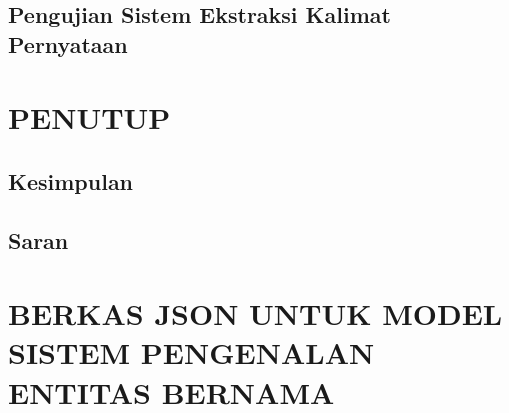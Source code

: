 \documentclass[ugmskripsi]{ugmskripsi}
\begin{document}
	\section{Pengujian Sistem Ekstraksi Kalimat Pernyataan}
	\label{pengujian sistem ekstraksi kalimat pernyataan}
	



\chapter{PENUTUP}
\label{PENUTUP}

	\section{Kesimpulan}
	\label{penutup kesimpulan}
	

	\section{Saran}
	\label{penutup saran}
	





\appendix

\chapter{BERKAS JSON UNTUK MODEL SISTEM PENGENALAN ENTITAS BERNAMA}
\label{BERKAS JSON UNTUK MODEL SISTEM PENGENALAN ENTITAS BERNAMA}


\end{document}
